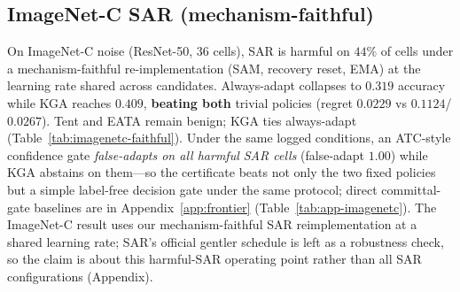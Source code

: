 \documentclass[conference]{IEEEtran}
\theoremstyle{plain}
\theoremstyle{definition}
\theoremstyle{remark}
\begin{document}
\begin{table}[t]\centering\small
\caption{\textbf{Pre-registered mixed head-to-head} (CIFAR-10-C stress, Tent, $432$ cond./seed,
$5$ seeds). POEM/AETTA rows are protocol-matched \emph{-style} ports, not official reproductions.
Regret-to-oracle$\downarrow$; $\mathrm{FA}_{\mathrm u}$ = unconditional false-adapt.
KGA vs.\ $X$: mean$(\mathrm{regret}_{\textsc{kga}}-\mathrm{regret}_X)$ with $95\%$ paired-bootstrap CI;
WIN iff both CIs exclude $0$ and survive Holm.}
\label{tab:headtohead-poem-aetta}
\end{table}

\subsection{ImageNet-C SAR (mechanism-faithful)}
On ImageNet-C noise (ResNet-50, $36$ cells), SAR is harmful on $44\%$ of cells under a
mechanism-faithful re-implementation (SAM, recovery reset, EMA) at the learning rate
shared across candidates. Always-adapt collapses to $0.319$ accuracy while \textsc{KGA}
reaches $0.409$, \textbf{beating both} trivial policies (regret $0.0229$ vs $0.1124$/
$0.0267$). Tent and EATA remain benign; \textsc{KGA} ties always-adapt
(Table~\ref{tab:imagenetc-faithful}). Under the same logged conditions, an ATC-style confidence gate
\emph{false-adapts on all harmful SAR cells} (false-adapt $1.00$) while \textsc{KGA} abstains on
them---so the certificate beats not only the two fixed policies but a simple label-free decision gate
under the same protocol; direct committal-gate baselines are in Appendix~\ref{app:frontier}
(Table~\ref{tab:app-imagenetc}). The ImageNet-C result uses our mechanism-faithful SAR
reimplementation at a shared learning rate; SAR's official gentler schedule is left as a
robustness check, so the claim is about this harmful-SAR operating point rather than all SAR
configurations (Appendix).
\end{document}
